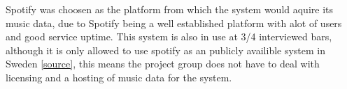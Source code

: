 Spotify was choosen as the platform from which the system would aquire its music data, due to Spotify being a well established platform with alot of users and good service uptime. This system is also in use at 3/4 interviewed bars, although it is only allowed to use spotify as an publicly availible system in Sweden \cref{source}, this means the project group does not have to deal with licensing and a hosting of music data for the system.
